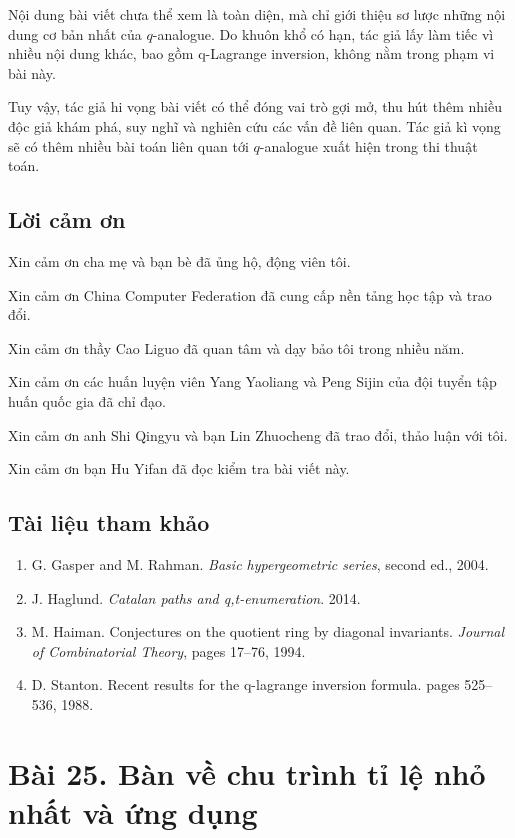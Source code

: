 \documentclass[11pt]{article}
\begin{document}
Nội dung bài viết chưa thể xem là toàn diện, mà chỉ giới thiệu sơ lược những
nội dung cơ bản nhất của \(q\)-analogue. Do khuôn khổ có hạn, tác giả lấy làm
tiếc vì nhiều nội dung khác, bao gồm q-Lagrange inversion, không nằm trong
phạm vi bài này.

Tuy vậy, tác giả hi vọng bài viết có thể đóng vai trò gợi mở, thu hút thêm
nhiều độc giả khám phá, suy nghĩ và nghiên cứu các vấn đề liên quan. Tác giả
kì vọng sẽ có thêm nhiều bài toán liên quan tới \(q\)-analogue xuất hiện trong
thi thuật toán.

\subsection*{Lời cảm ơn}

Xin cảm ơn cha mẹ và bạn bè đã ủng hộ, động viên tôi.

Xin cảm ơn China Computer Federation đã cung cấp nền tảng học tập và trao đổi.

Xin cảm ơn thầy Cao Liguo đã quan tâm và dạy bảo tôi trong nhiều năm.

Xin cảm ơn các huấn luyện viên Yang Yaoliang và Peng Sijin của đội tuyển tập
huấn quốc gia đã chỉ đạo.

Xin cảm ơn anh Shi Qingyu và bạn Lin Zhuocheng đã trao đổi, thảo luận với tôi.

Xin cảm ơn bạn Hu Yifan đã đọc kiểm tra bài viết này.

\subsection*{Tài liệu tham khảo}

\begin{enumerate}
\item G. Gasper and M. Rahman. \emph{Basic hypergeometric series}, second ed.,
2004.
\item J. Haglund. \emph{Catalan paths and q,t-enumeration}. 2014.
\item M. Haiman. Conjectures on the quotient ring by diagonal invariants.
\emph{Journal of Combinatorial Theory}, pages 17--76, 1994.
\item D. Stanton. Recent results for the q-lagrange inversion formula. pages
525--536, 1988.
\end{enumerate}

\section*{Bài 25. Bàn về chu trình tỉ lệ nhỏ nhất và ứng dụng}
\end{document}
